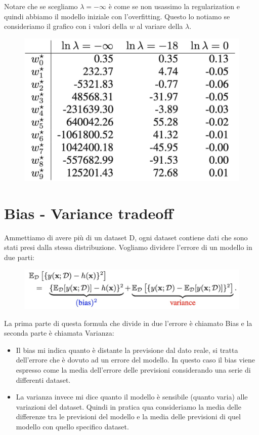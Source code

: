 \documentclass[14pt]{extreport}
\begin{document}
Notare che se scegliamo $\lambda = - \infty$ è come se non usassimo la regularization e quindi abbiamo il modello iniziale con l'overfitting. Questo lo
notiamo se consideriamo il grafico con i valori della $w$ al variare della $\lambda$.

\begin{figure}[H]
\centering
\includegraphics[width=0.4\linewidth]{91.jpeg}
\end{figure}


\section{Bias - Variance tradeoff}

Ammettiamo di avere più di un dataset D, ogni dataset contiene dati che sono stati presi dalla stessa distribuzione. Vogliamo dividere l'errore di un
modello in due parti:

\begin{figure}[H]
\centering
\includegraphics[width=0.7\linewidth]{92.jpeg}
\end{figure}

La prima parte di questa formula che divide in due l'errore è chiamato Bias e la seconda parte è chiamata Varianza:
\begin{itemize}
\item Il bias mi indica quanto è distante la previsione dal dato reale, si tratta dell'errore che è dovuto ad un errore del modello. In questo caso il
bias viene espresso come la media dell'errore delle previsioni considerando una serie di differenti dataset.
\item La varianza invece mi dice quanto il modello è sensibile (quanto varia) alle variazioni del dataset. Quindi in pratica qua consideriamo la media
delle differenze tra le previsioni del modello e la media delle previsioni di quel modello con quello specifico dataset.
\end{itemize}
\end{document}
